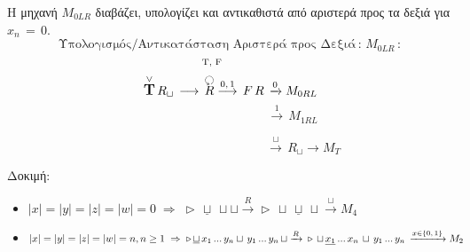 \par Η μηχανή $M_{0LR}$ διαβάζει, υπολογίζει και αντικαθιστά από αριστερά προς τα δεξιά για $x_n\,=\,0$.
\[\text{Υπολογισμός/Αντικατάσταση Αριστερά προς Δεξιά}\,:\, M_{0LR}\,:\]
\[{\text{\scriptsize T, F}}\qquad\quad\]
\reducevspace\reducevspace\reducevspace\reducevspace\reducevspace\reducevspace\reducevspace\reducevspace
\reducevspace\reducevspace\reducevspace\reducevspace\reducevspace\reducevspace\reducevspace\reducevspace
\reducevspace\reducevspace\reducevspace\reducevspace\reducevspace\reducevspace\reducevspace\reducevspace
\reducevspace\reducevspace\reducevspace\reducevspace\reducevspace\reducevspace\reducevspace\reducevspace
\[\overset{\lor}{{\text{\large\bfseries T}}}\,R_\sqcup\, \longrightarrow\, \overset{\botcircleleft}{R}
\overset{0,\,1}{\longrightarrow}\,
F\,R\,\xrightarrow{0} M_{0RL}\]
\reducevspace\reducevspace\reducevspace\reducevspace\reducevspace\reducevspace\reducevspace
\reducevspace\reducevspace\reducevspace\reducevspace\reducevspace\reducevspace\reducevspace
\reducevspace\reducevspace\reducevspace\reducevspace\reducevspace\reducevspace\reducevspace
\reducevspace\reducevspace\reducevspace\reducevspace\reducevspace\reducevspace\reducevspace
\[\qquad\qquad\qquad\qquad\quad\;\;\;\,\xrightarrow{1}\, M_{1RL}\]

\reducevspace\reducevspace\reducevspace\reducevspace\reducevspace\reducevspace\reducevspace\reducevspace\reducevspace
\reducevspace\reducevspace\reducevspace\reducevspace\reducevspace\reducevspace\reducevspace\reducevspace\reducevspace
\reducevspace\reducevspace\reducevspace\reducevspace\reducevspace\reducevspace\reducevspace\reducevspace\reducevspace
\reducevspace\reducevspace\reducevspace\reducevspace\reducevspace\reducevspace\reducevspace\reducevspace\reducevspace
\[\qquad\qquad\qquad\qquad\qquad\quad\;\;\,\xrightarrow{\sqcup}\, R_\sqcup \rightarrow M_T\]
\par Δοκιμή:
\begin{itemize}
	\itemsep0em
	\item $|x| = |y| = |z| = |w| = 0 \;\Rightarrow\;\triangleright\, \underline{\sqcup}\, \sqcup \sqcup
	\xrightarrow{R} \triangleright\, \sqcup\, \underline{\sqcup}\, \sqcup \xrightarrow{\sqcup} M_4 \quad$
	\textcolor{green}{}

	\item $|x| = |y| = |z| = |w| = n, n \geq 1 \;\Rightarrow\;\triangleright\, \underline{\sqcup}\, x_1\,...\,y_n
	\sqcup\, y_1\,...\,y_n\, \sqcup \xrightarrow{R}\\ \triangleright\, \sqcup\, \underline{x_1}\,...\,x_n\,
	\sqcup\,
	y_1\,...\,y_n\, \xrightarrow{x \in \{0,\,1\}} M_2 \quad$
	\textcolor{green}{}
\end{itemize}


